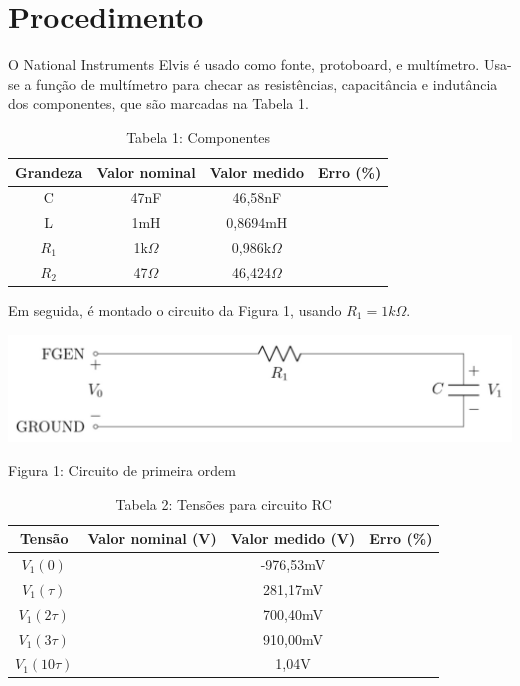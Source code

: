 \documentclass[a4 paper]{article}
\newcommand{\parag}{\hspace{30pt}}
\begin{document}
\newpage
\section{Procedimento}

\parag O National Instruments Elvis é usado como fonte, protoboard, e multímetro. Usa-se a função de multímetro para checar as resistências, capacitância e indutância dos componentes, que são marcadas na Tabela 1.

\vspace{5pt}
\begin{table}[h]
\centering
\begin{tabular}{|c|c|c|c|}
\hline
Grandeza & Valor nominal & Valor medido & Erro (\%) \\\hline
C & 47nF & 46,58nF & \\    \hline
L & 1mH & 0,8694mH & \\    \hline
$R_1$ & 1k$\Omega$ & 0,986k$\Omega$ & \\\hline
$R_2$ & 47$\Omega$ & 46,424$\Omega$ & \\\hline
\end{tabular}
\caption*{Tabela 1: Componentes}
\end{table}

Em seguida, é montado o circuito da Figura 1, usando $R_1=1k\Omega$.

\begin{table}[h]
\centering
\includegraphics[scale=0.3]{figuras/figura1}
\end{table}

\begin{center}
Figura 1: Circuito de primeira ordem
\end{center}

\vspace{5pt}
\begin{table}[h]
\centering
\begin{tabular}{|c|c|c|c|}
\hline
Tensão & Valor nominal (V) & Valor medido (V) & Erro (\%) \\\hline
$V_1(0)$ &  & -976,53mV & \\    \hline
$V_1(\tau)$ &  & 281,17mV & \\    \hline
$V_1(2\tau)$ &  & 700,40mV & \\\hline
$V_1(3\tau)$ &  & 910,00mV & \\\hline
$V_1(10\tau)$ &  & 1,04V & \\\hline
\end{tabular}
\caption*{Tabela 2: Tensões para circuito RC}
\end{table}
\end{document}
